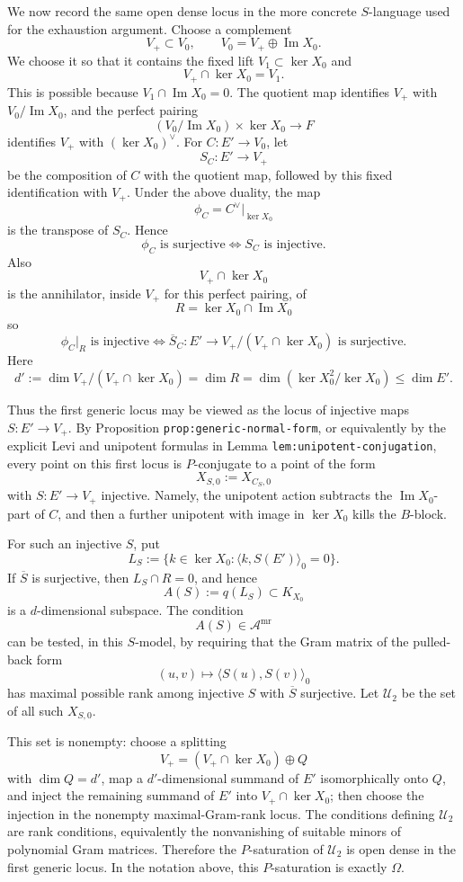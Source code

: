 \documentclass[
  11pt,
]{article}
\begin{document}
We now record the same open dense locus in the more concrete
\(S\)-language used for the exhaustion argument. Choose a complement \[
V_+\subset V_0,\qquad V_0=V_+\oplus \operatorname{Im}X_0.
\] We choose it so that it contains the fixed lift
\(V_1\subset\ker X_0\) and \[
V_+\cap\ker X_0=V_1.
\] This is possible because \(V_1\cap\operatorname{Im}X_0=0\). The
quotient map identifies \(V_+\) with \(V_0/\operatorname{Im}X_0\), and
the perfect pairing \[
(V_0/\operatorname{Im}X_0)\times \ker X_0\to F
\] identifies \(V_+\) with \((\ker X_0)^\vee\). For \(C:E'\to V_0\), let
\[
S_C:E'\to V_+
\] be the composition of \(C\) with the quotient map, followed by this
fixed identification with \(V_+\). Under the above duality, the map \[
\phi_C=C^\vee|_{\ker X_0}
\] is the transpose of \(S_C\). Hence \[
\phi_C\text{ is surjective}\iff S_C\text{ is injective}.
\] Also \[
V_+\cap\ker X_0
\] is the annihilator, inside \(V_+\) for this perfect pairing, of \[
R=\ker X_0\cap\operatorname{Im}X_0
\] so \[
\phi_C|_R\text{ is injective}
\iff
\overline S_C:E'\to V_+/(V_+\cap\ker X_0)
\text{ is surjective}.
\] Here \[
d':=\dim V_+/(V_+\cap\ker X_0)
=\dim R
=\dim(\ker X_0^2/\ker X_0)
\le \dim E'.
\]

Thus the first generic locus may be viewed as the locus of injective
maps \(S:E'\to V_+\). By Proposition \texttt{prop:generic-normal-form},
or equivalently by the explicit Levi and unipotent formulas in Lemma
\texttt{lem:unipotent-conjugation}, every point on this first locus is
\(P\)-conjugate to a point of the form \[
X_{S,0}:=X_{C_S,0}
\] with \(S:E'\to V_+\) injective. Namely, the unipotent action
subtracts the \(\operatorname{Im}X_0\)-part of \(C\), and then a further
unipotent with image in \(\ker X_0\) kills the \(B\)-block.

For such an injective \(S\), put \[
L_S:=\{k\in\ker X_0:\langle k,S(E')\rangle_0=0\}.
\] If \(\overline S\) is surjective, then \(L_S\cap R=0\), and hence \[
A(S):=q(L_S)\subset K_{X_0}
\] is a \(d\)-dimensional subspace. The condition \[
A(S)\in\mathscr A^{\mathrm{mr}}
\] can be tested, in this \(S\)-model, by requiring that the Gram matrix
of the pulled-back form \[
(u,v)\longmapsto \langle S(u),S(v)\rangle_0
\] has maximal possible rank among injective \(S\) with \(\overline S\)
surjective. Let \(\mathcal U_2\) be the set of all such \(X_{S,0}\).

This set is nonempty: choose a splitting \[
V_+= (V_+\cap\ker X_0)\oplus Q
\] with \(\dim Q=d'\), map a \(d'\)-dimensional summand of \(E'\)
isomorphically onto \(Q\), and inject the remaining summand of \(E'\)
into \(V_+\cap\ker X_0\); then choose the injection in the nonempty
maximal-Gram-rank locus. The conditions defining \(\mathcal U_2\) are
rank conditions, equivalently the nonvanishing of suitable minors of
polynomial Gram matrices. Therefore the \(P\)-saturation of
\(\mathcal U_2\) is open dense in the first generic locus. In the
notation above, this \(P\)-saturation is exactly \(\Omega\).
\end{document}
